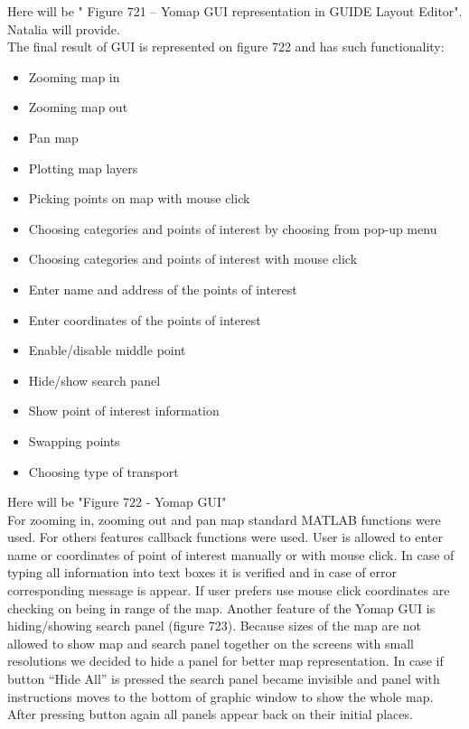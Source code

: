 			Here will be " Figure 721 – Yomap GUI representation in GUIDE Layout Editor". Natalia will provide.\\
			
			The final result of GUI is represented on figure 722 and has such functionality: 
			\begin{itemize}
				\item Zooming map in
				\item Zooming map out
				\item Pan map
				\item Plotting map layers
				\item Picking points on map with mouse click
				\item Choosing categories and points of interest by choosing from pop-up menu
				\item Choosing categories and points of interest with mouse click
				\item Enter name and address of the points of interest
				\item Enter coordinates of the points of interest
				\item Enable/disable middle point
				\item Hide/show search panel
				\item Show point of interest information
				\item Swapping points
				\item Choosing type of transport  
			\end{itemize}
			
			Here will be "Figure 722 - Yomap GUI"\\
			
			For zooming in, zooming out and pan map standard MATLAB functions were used. For others features callback functions were used. 
			User is allowed to enter name or coordinates of point of interest manually or with mouse click. In case of typing all information into text boxes it is verified and in case of error corresponding message is appear. If user prefers use mouse click coordinates are checking on being in range of the map.
			Another feature of the Yomap GUI is hiding/showing search panel (figure 723). Because sizes of the map are not allowed to show map and search panel together on the screens with small resolutions we decided to hide a panel for better map representation. In case if button “Hide All” is pressed the search panel became invisible and panel with instructions moves to the bottom of graphic window to show the whole map. After pressing button again all panels appear back on their initial places. 
			
